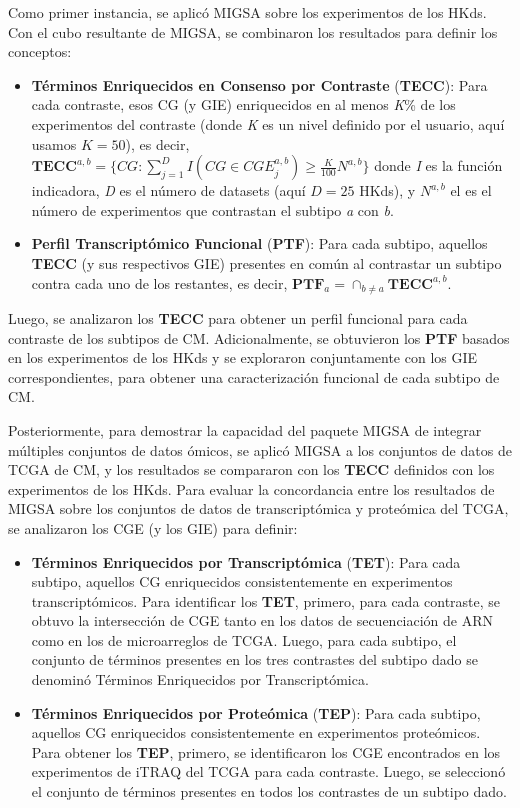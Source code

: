 \documentclass[12pt,twoside]{reedthesis}
\providecommand{\tightlist}{%
  \setlength{\itemsep}{0pt}\setlength{\parskip}{0pt}}
\begin{document}
Como primer instancia, se aplicó MIGSA sobre los experimentos de los HKds. Con el cubo resultante de MIGSA, se combinaron los resultados para definir los conceptos:
\begin{itemize}
\tightlist
\item
  \textbf{Términos Enriquecidos en Consenso por Contraste} (\textbf{TECC}): Para cada contraste, esos CG (y GIE) enriquecidos en al menos \emph{K}\% de los experimentos del contraste (donde \emph{K} es un nivel definido por el usuario, aquí usamos \(K=50\)), es decir, \(\boldsymbol{TECC}^{a,b}=\{CG:\sum_{j=1}^D I(CG \in CGE_j^{a,b}) \ge \frac{K}{100}N^{a,b}\}\) donde \emph{I} es la función indicadora, \emph{D} es el número de datasets (aquí \(D=25\) HKds), y \(N^{a,b}\) el es el número de experimentos que contrastan el subtipo \emph{a} con \emph{b}.
\item
  \textbf{Perfil Transcriptómico Funcional} (\textbf{PTF}): Para cada subtipo, aquellos \textbf{TECC} (y sus respectivos GIE) presentes en común al contrastar un subtipo contra cada uno de los restantes, es decir, \(\boldsymbol{PTF}_a=\cap_{b \neq a} \boldsymbol{TECC}^{a,b}\).
\end{itemize}
\par

Luego, se analizaron los \textbf{TECC} para obtener un perfil funcional para cada contraste de los subtipos de CM. Adicionalmente, se obtuvieron los \textbf{PTF} basados en los experimentos de los HKds y se exploraron conjuntamente con los GIE correspondientes, para obtener una caracterización funcional de cada subtipo de CM.

\par

Posteriormente, para demostrar la capacidad del paquete MIGSA de integrar múltiples conjuntos de datos ómicos, se aplicó MIGSA a los conjuntos de datos de TCGA de CM, y los resultados se compararon con los \textbf{TECC} definidos con los experimentos de los HKds. Para evaluar la concordancia entre los resultados de MIGSA sobre los conjuntos de datos de transcriptómica y proteómica del TCGA, se analizaron los CGE (y los GIE) para definir:
\begin{itemize}
\tightlist
\item
  \textbf{Términos Enriquecidos por Transcriptómica} (\textbf{TET}): Para cada subtipo, aquellos CG enriquecidos consistentemente en experimentos transcriptómicos. Para identificar los \textbf{TET}, primero, para cada contraste, se obtuvo la intersección de CGE tanto en los datos de secuenciación de ARN como en los de microarreglos de TCGA. Luego, para cada subtipo, el conjunto de términos presentes en los tres contrastes del subtipo dado se denominó Términos Enriquecidos por Transcriptómica.
\item
  \textbf{Términos Enriquecidos por Proteómica} (\textbf{TEP}): Para cada subtipo, aquellos CG enriquecidos consistentemente en experimentos proteómicos. Para obtener los \textbf{TEP}, primero, se identificaron los CGE encontrados en los experimentos de iTRAQ del TCGA para cada contraste. Luego, se seleccionó el conjunto de términos presentes en todos los contrastes de un subtipo dado.
\end{itemize}
\par
\end{document}
